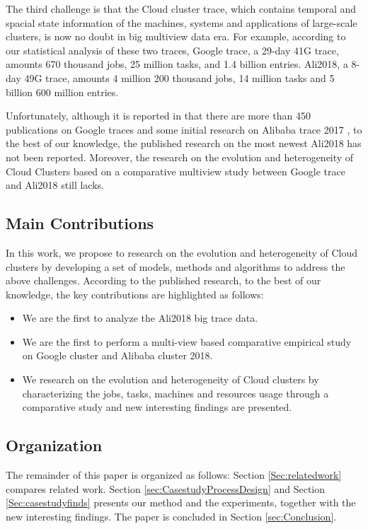 \documentclass[conference]{IEEEtran}
\begin{document}
The third challenge is that the Cloud cluster trace, which contains temporal and spacial state information of the machines, systems and applications of large-scale clusters, is now no doubt in big  multiview data era. For example, according to our statistical analysis of these two traces, Google trace, a 29-day 41G trace, amounts 670 thousand jobs, 25 million tasks, and 1.4 billion entries. Ali2018, a 8-day 49G trace, amounts 4 million 200 thousand jobs, 14 million tasks and 5 billion 600 million entries.

Unfortunately, although it is reported in \cite{George2018Diversity} that there are  more than 450 publications on Google traces\cite{gupta2017resource}\cite{zhang2016workload}\cite{peng2018multi} and some initial research on Alibaba trace 2017 \cite{chen2018Alibabaworkload}, to the best of our knowledge, the published research on  the most newest Ali2018 has not been reported. Moreover, the research on the evolution and heterogeneity of  Cloud Clusters based on a comparative multiview study between  Google trace and Ali2018  still lacks.

\subsection{Main Contributions}
In this work, we propose to research on the evolution and heterogeneity of Cloud clusters by developing a set of models, methods and algorithms  to address the above challenges. According to the published research, to the best of our knowledge, the key contributions are highlighted as follows:
\begin{itemize}
\item We are the first to analyze the Ali2018 big trace data.
\item  We are the first to perform a multi-view based comparative  empirical study on Google cluster and Alibaba cluster 2018.
\item We research  on  the  evolution  and heterogeneity of Cloud clusters by characterizing the jobs, tasks, machines and resources usage through a comparative study and new interesting findings are presented. 
\end{itemize}

\subsection{Organization}

The remainder of this paper is organized as follows:  Section \ref{Sec:relatedwork}  compares  related work. Section  \ref{sec:CasestudyProcessDesign} and Section  \ref{Sec:casestudyfinds} presents our method and the experiments, together with the new interesting findings. The paper is concluded in Section \ref{sec:Conclusion}.
\end{document}

